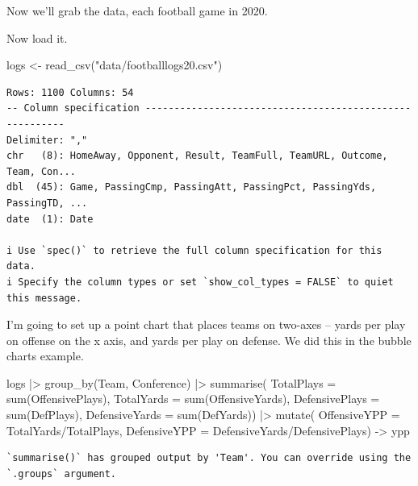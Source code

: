 \documentclass[
  letterpaper,
  DIV=11,
  numbers=noendperiod]{scrreprt}
\newenvironment{Shaded}{\begin{snugshade}}{\end{snugshade}}
\newcommand{\AttributeTok}[1]{\textcolor[rgb]{0.40,0.45,0.13}{#1}}
\newcommand{\FunctionTok}[1]{\textcolor[rgb]{0.28,0.35,0.67}{#1}}
\newcommand{\NormalTok}[1]{\textcolor[rgb]{0.00,0.23,0.31}{#1}}
\newcommand{\OtherTok}[1]{\textcolor[rgb]{0.00,0.23,0.31}{#1}}
\newcommand{\SpecialCharTok}[1]{\textcolor[rgb]{0.37,0.37,0.37}{#1}}
\newcommand{\StringTok}[1]{\textcolor[rgb]{0.13,0.47,0.30}{#1}}
\begin{document}
Now we'll grab the data, each football game in 2020.

Now load it.

\begin{Shaded}
\begin{Highlighting}[]
\NormalTok{logs }\OtherTok{\textless{}{-}} \FunctionTok{read\_csv}\NormalTok{(}\StringTok{"data/footballlogs20.csv"}\NormalTok{)}
\end{Highlighting}
\end{Shaded}

\begin{verbatim}
Rows: 1100 Columns: 54
-- Column specification --------------------------------------------------------
Delimiter: ","
chr   (8): HomeAway, Opponent, Result, TeamFull, TeamURL, Outcome, Team, Con...
dbl  (45): Game, PassingCmp, PassingAtt, PassingPct, PassingYds, PassingTD, ...
date  (1): Date

i Use `spec()` to retrieve the full column specification for this data.
i Specify the column types or set `show_col_types = FALSE` to quiet this message.
\end{verbatim}

I'm going to set up a point chart that places teams on two-axes -- yards
per play on offense on the x axis, and yards per play on defense. We did
this in the bubble charts example.

\begin{Shaded}
\begin{Highlighting}[]
\NormalTok{logs }\SpecialCharTok{|\textgreater{}} 
  \FunctionTok{group\_by}\NormalTok{(Team, Conference) }\SpecialCharTok{|\textgreater{}} 
  \FunctionTok{summarise}\NormalTok{(}
    \AttributeTok{TotalPlays =} \FunctionTok{sum}\NormalTok{(OffensivePlays), }
    \AttributeTok{TotalYards =} \FunctionTok{sum}\NormalTok{(OffensiveYards), }
    \AttributeTok{DefensivePlays =} \FunctionTok{sum}\NormalTok{(DefPlays), }
    \AttributeTok{DefensiveYards =} \FunctionTok{sum}\NormalTok{(DefYards)) }\SpecialCharTok{|\textgreater{}} 
  \FunctionTok{mutate}\NormalTok{(}
    \AttributeTok{OffensiveYPP =}\NormalTok{ TotalYards}\SpecialCharTok{/}\NormalTok{TotalPlays, }
    \AttributeTok{DefensiveYPP =}\NormalTok{ DefensiveYards}\SpecialCharTok{/}\NormalTok{DefensivePlays) }\OtherTok{{-}\textgreater{}}\NormalTok{ ypp}
\end{Highlighting}
\end{Shaded}

\begin{verbatim}
`summarise()` has grouped output by 'Team'. You can override using the
`.groups` argument.
\end{verbatim}
\end{document}

